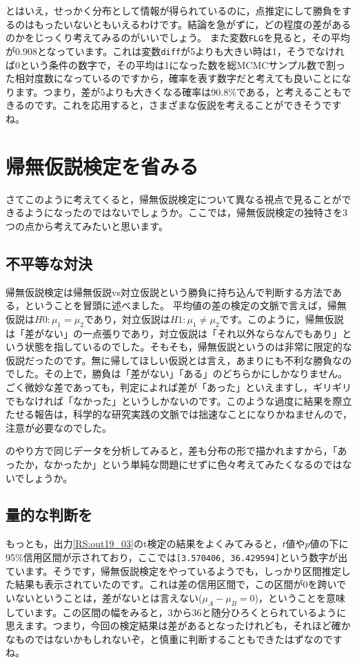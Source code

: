 \documentclass{ltjsbook}
\begin{document}
とはいえ，せっかく分布として情報が得られているのに，点推定にして勝負をするのはもったいないともいえるわけです。結論を急がずに，どの程度の差があるのかをじっくり考えてみるのがいいでしょう。
また変数\verb|FLG|を見ると，その平均が0.908となっています。これは変数\verb|diff|が5よりも大きい時は1，そうでなければ0という条件の数字で，その平均は1になった数を総MCMCサンプル数で割った相対度数になっているのですから，確率を表す数字だと考えても良いことになります。つまり，差が5よりも大きくなる確率は90.8\%である，と考えることもできるのです。これを応用すると，さまざまな仮説を考えることができそうですね。

\section{帰無仮説検定を省みる}
さてこのように考えてくると，帰無仮説検定について異なる視点で見ることができるようになったのではないでしょうか。ここでは，帰無仮説検定の独特さを3つの点から考えてみたいと思います。
\subsection{不平等な対決}
帰無仮説検定は帰無仮説vs対立仮説という勝負に持ち込んで判断する方法である，ということを冒頭に述べました。
平均値の差の検定の文脈で言えば，帰無仮説は$H0:\mu_1=\mu_2$であり，対立仮説は$H1:\mu_1\neq\mu_2$です。このように，帰無仮説は「差がない」の一点張りであり，対立仮説は「それ以外ならなんでもあり」という状態を指しているのでした。そもそも，帰無仮説というのは非常に限定的な仮説だったのです。無に帰してほしい仮説とは言え，あまりにも不利な勝負なのでした。その上で，勝負は「差がない」「ある」のどちらかにしかなりません。ごく微妙な差であっても，判定によれば差が「あった」といえますし，ギリギリでもなければ「なかった」というしかないのです。このような過度に結果を際立たせる報告は，科学的な研究実践の文脈では拙速なことになりかねませんので，注意が必要なのでした。

のやり方で同じデータを分析してみると，差も分布の形で描かれますから，「あったか，なかったか」という単純な問題にせずに色々考えてみたくなるのではないでしょうか。
\subsection{量的な判断を}
もっとも，出力\ref{RS:out19_03}のt検定の結果をよくみてみると，$t$値や$p$値の下に95\%信用区間が示されており，ここでは\verb|[3.570406, 36.429594]|という数字が出ています。そうです，帰無仮説検定をやっているようでも，しっかり区間推定した結果も表示されていたのです。これは差の信用区間で，この区間が0を跨いでいないということは，差がないとは言えない($\mu_A-\mu_B=0$)，ということを意味しています。この区間の幅をみると，3から36と随分ひろくとられているように思えます。つまり，今回の検定結果は差があるとなったけれども，それほど確かなものではないかもしれないぞ，と慎重に判断することもできたはずなのですね。
\end{document}
